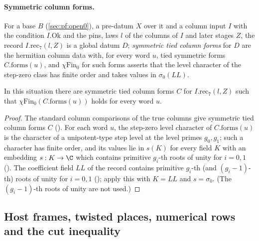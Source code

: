 \paragraph{Symmetric column forms.} For a base $B$ (\cref{sec:pf:open0}), a pre-datum $X$ over it and a column input $I$ with the
condition $I.\mathrm{Ok}$ and the pins, laws $l$ of the columns of $I$ and later stages $Z$, the record $I.\mathrm{rec}_7(l,Z)$ is a
global datum $D$; \emph{symmetric tied column forms} for $D$ are the hermitian column data with, for every word $u$, tied symmetric forms
$C.\mathrm{forms}(u)$, and $\chi\mathrm{Fin}_0$ for such forms asserts that the level character of the step-zero class has finite order
and takes values in $\sigma_0(\mathit{LL})$.

\begin{proposition}\label{pf:sh-div:symcol}
In this situation there are symmetric tied column forms $C$ for $I.\mathrm{rec}_7(l,Z)$ such that $\chi\mathrm{Fin}_0(C.\mathrm{forms}(u))$
holds for every word $u$.
\end{proposition}

\begin{proof}
The standard column comparisons of the true columns give symmetric tied column forms $C$
(). For each word $u$, the step-zero level character of
$C.\mathrm{forms}(u)$ is the character of a unipotent-type step level at the level primes $g_0,g_1$; such a character has finite
order, and its values lie in $s(K)$ for every field $K$ with an embedding $s:K\to\C$ which contains primitive $g_i$-th roots of unity
for $i=0,1$ (). The coefficient field $\mathit{LL}$ of the
record contains primitive $g_i$-th (and $(g_i-1)$-th) roots of unity for $i=0,1$
(); apply this with $K=\mathit{LL}$ and $s=\sigma_0$. (The
$(g_i-1)$-th roots of unity are not used.)
\end{proof}

\subsection{Host frames, twisted places, numerical rows and the cut inequality}\label{sec:pf:sh-div:frames}

